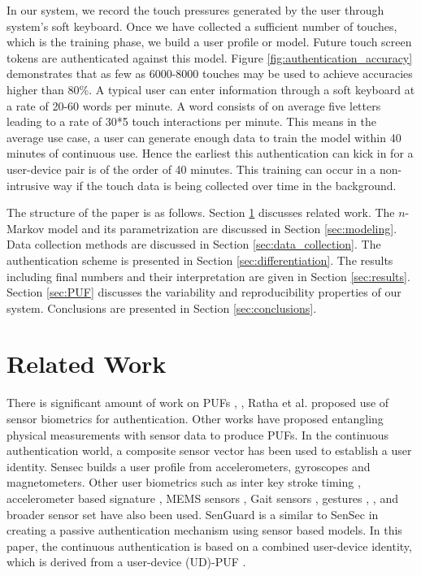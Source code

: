 \documentclass{acm_proc_article-sp}
\begin{document}
In our system, we record the touch pressures generated by the user through system's soft keyboard. Once we have collected a sufficient number of touches, which is the training phase, we build 
a user profile or model. Future touch screen tokens are authenticated against this model. Figure \ref{fig:authentication_accuracy} demonstrates that as few as 6000-8000 touches may be used to achieve accuracies higher than 80\%.
A typical user can enter information through a soft keyboard at a rate of 20-60 words per minute. %
A word consists of on average five letters  leading to a rate of 30*5 touch interactions per minute. 
This means in the average use case, a user can generate enough data to train
the model within 40 minutes of continuous use. Hence the earliest this authentication can kick in
for a user-device pair is of the order of 40 minutes.
This training can occur in a non-intrusive way
if the touch data is being collected over time in the background.

The structure of the paper is as follows. Section \ref{sec:related_work} discusses related work. The $n$-Markov model and its parametrization are discussed in Section \ref{sec:modeling}. 
Data collection methods are discussed in Section \ref{sec:data_collection}. The authentication scheme is presented in Section \ref{sec:differentiation}. The results including final numbers and 
their interpretation are given in Section \ref{sec:results}.
Section \ref{sec:PUF} discusses the variability and reproducibility properties of our system.
Conclusions are presented in Section \ref{sec:conclusions}. 

\section{Related Work}
\label{sec:related_work}
There is significant amount of work on PUFs \cite{Devadas:2009:PUF}, \cite{PUFIntro}, \cite{Gassend:2002:SPR}
Ratha et al. \cite{Ratha:2001} proposed use of sensor biometrics for authentication.
Other works \cite{rosenfeld2010sensor} have proposed entangling physical measurements with sensor data
to produce PUFs.
In the continuous authentication world, a composite sensor vector \cite{zhu2013sensec} has been used
to establish a user identity. Sensec builds a user profile from accelerometers, gyroscopes and magnetometers. Other user biometrics such as inter key stroke timing 
\cite{KeystrokeHASE14},  accelerometer based signature \cite{Liu:2009:UAP}, MEMS sensors
\cite{Aysu:2013:DFL}, Gait sensors \cite{Gait}, gestures \cite{touchscreengestures}, \cite{Gesture14}, and 
broader sensor set \cite{Dey:2013:AHP} have also been
used. 
SenGuard \cite{shi2011senguard} is a similar to SenSec in creating a passive
authentication mechanism using sensor based models. In this paper, the continuous authentication is based on a combined user-device identity,
which is derived from a user-device (UD)-PUF \cite{ScheelTyagi15}.
\end{document}
